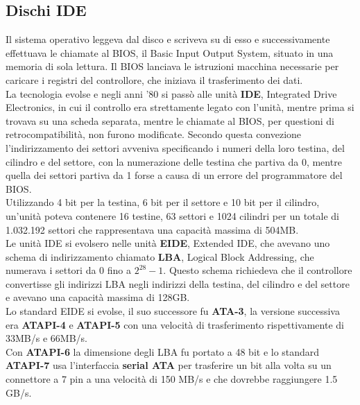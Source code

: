 \documentclass[12pt]{report}
\begin{document}
\subsection{Dischi IDE}
Il sistema operativo leggeva dal disco e scriveva su di esso e successivamente effettuava le chiamate al BIOS, il Basic Input Output System, situato in una memoria di sola lettura. Il BIOS lanciava le istruzioni macchina necessarie per caricare i registri del controllore, che iniziava il trasferimento dei dati. \\
La tecnologia evolse e negli anni '80 si passò alle unità \textbf{IDE}, Integrated Drive Electronics, in cui il controllo era strettamente legato con l'unità, mentre prima si trovava su una scheda separata, mentre le chiamate al BIOS, per questioni di retrocompatibilità, non furono modificate. Secondo questa convezione l'indirizzamento dei settori avveniva specificando i numeri della loro testina, del cilindro e del settore, con la numerazione delle testina che partiva da 0, mentre quella dei settori partiva da 1 forse a causa di un errore del programmatore del BIOS. \\
Utilizzando 4 bit per la testina, 6 bit per il settore e 10 bit per il cilindro, un'unità poteva contenere 16 testine, 63 settori e 1024 cilindri per un totale di 1.032.192 settori che rappresentava una capacità massima di 504MB. \\
Le unità IDE si evolsero nelle unità \textbf{EIDE}, Extended IDE, che avevano uno schema di indirizzamento chiamato \textbf{LBA}, Logical Block Addressing, che numerava i settori da 0 fino a $2^{28} - 1$. Questo schema richiedeva che il controllore convertisse gli indirizzi LBA negli indirizzi della testina, del cilindro e del settore e avevano una capacità massima di 128GB. \\
Lo standard EIDE si evolse, il suo successore fu \textbf{ATA-3}, la versione successiva era \textbf{ATAPI-4} e \textbf{ATAPI-5} con una velocità di trasferimento rispettivamente di 33MB/s e 66MB/s. \\
Con \textbf{ATAPI-6} la dimensione degli LBA fu portato a 48 bit e lo standard \textbf{ATAPI-7} usa l'interfaccia \textbf{serial ATA} per trasferire un bit alla volta su un connettore a 7 pin a una velocità di 150 MB/s e che dovrebbe raggiungere 1.5 GB/s.
\end{document}

